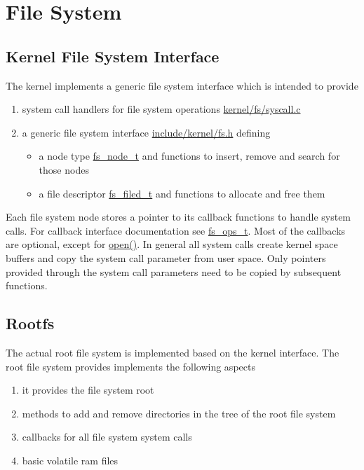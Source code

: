 %
%
%



\section{File System}
	\subsection{Kernel File System Interface}
		The kernel implements a generic file system interface which is intended to provide
		\begin{enumerate}
			\item system call handlers for file system operations \hyperref[kernel_2fs_2syscall_8c]{kernel/fs/syscall.c}
			\item a generic file system interface \hyperref[fs_8h]{include/kernel/fs.h} defining
				\begin{itemize}
					\item a node type \hyperref[structfs__node__t]{fs\_node\_t} and functions to insert, remove and search for those nodes
					\item a file descriptor \hyperref[structfs__filed__t]{fs\_filed\_t} and functions to allocate and free them
				\end{itemize}
		\end{enumerate}

		Each file system node stores a pointer to its callback functions to handle system calls. For callback interface documentation see \hyperref[structfs__ops__t]{fs\_ops\_t}. Most of the callbacks are optional, except for \hyperref[structfs__ops__t_a0ea05ccab180719ed0f32631d5ad71bf]{open()}.
		In general all system calls create kernel space buffers and copy the system call parameter from user space. Only pointers provided through the system call parameters need to be copied by subsequent functions.

	\subsection{Rootfs}
		The actual root file system is implemented based on the kernel interface. The root file system provides implements the following aspects
		\begin{enumerate}
			\item it provides the file system root
			\item methods to add and remove directories in the tree of the root file system
			\item callbacks for all file system system calls
			\item basic volatile ram files
		\end{enumerate}

